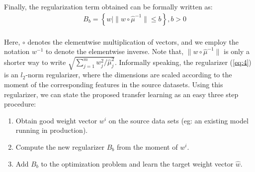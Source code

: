 \documentclass[a4paper]{article}
\begin{document}
\noindent Finally, the regularization term obtained can be formally written as: \\
\begin{equation} \label{eq:4}
\begin{aligned}
& & B_b = \left\{ w \mid \| w \circ \hat{\mu}^{-1} \| \leq b \right\}, b > 0\\
\end{aligned}
\end{equation}

\noindent Here, $\circ$ denotes the elementwise multiplication of vectors, and we employ the notation $w^{-1}$ to denote the elementwise inverse. Note that, $\| w \circ \hat{\mu}^{-1} \|$ is only a shorter way to write $\sqrt{\sum_{j=1}^{m} w_j^2/\hat{\mu}_j^2}$. Informally speaking, the regularizer (\ref{eq:4}) is an $l_2$-norm regularizer, where the dimensions are scaled according to the moment of the corresponding features in the source datasets. Using this regularizer, we can state the proposed transfer learning as an easy three step procedure:
\begin{enumerate}
\item Obtain good weight vector $w^i$ on the source data sets (eg: an existing model running in production).
\item Compute the new regularizer $B_b$ from the moment of $w^i$.
\item Add $B_b$ to the optimization problem and learn the target weight vector $\hat{w}$.
\end{enumerate}

\end{document}
